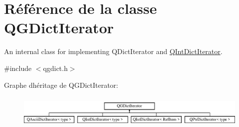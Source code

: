 \hypertarget{class_q_g_dict_iterator}{}\section{Référence de la classe Q\+G\+Dict\+Iterator}
\label{class_q_g_dict_iterator}


An internal class for implementing Q\+Dict\+Iterator and \hyperlink{class_q_int_dict_iterator}{Q\+Int\+Dict\+Iterator}.  




{\ttfamily \#include $<$qgdict.\+h$>$}

Graphe d\textquotesingle{}héritage de Q\+G\+Dict\+Iterator\+:\begin{figure}[H]
\begin{center}
\leavevmode
\includegraphics[height=1.647059cm]{class_q_g_dict_iterator}
\end{center}
\end{figure}
